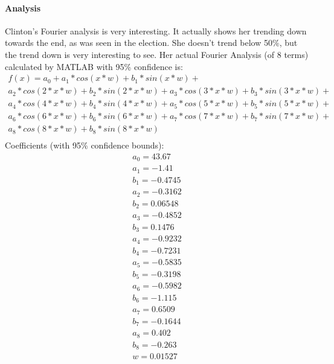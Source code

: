\documentclass[twoside]{article}
\begin{document}
              \paragraph{Analysis} Clinton's Fourier analysis is very interesting. It actually shows her trending down towards the end, as was seen in the election.
              She doesn't trend below 50\%, but the trend down is very interesting to see. Her actual Fourier Analysis (of 8 terms) calculated by MATLAB with 95\% confidence is:
              \newpage
              \begin{gather*}
                f(x) =
                a_0 + a_1*cos(x*w) + b_1*sin(x*w) + \\
                a_2*cos(2*x*w) + b_2*sin(2*x*w) + a_3*cos(3*x*w) + b_3*sin(3*x*w) + \\
                a_4*cos(4*x*w) + b_4*sin(4*x*w) + a_5*cos(5*x*w) + b_5*sin(5*x*w) + \\
                a_6*cos(6*x*w) + b_6*sin(6*x*w) + a_7*cos(7*x*w) + b_7*sin(7*x*w) + \\
                a_8*cos(8*x*w) + b_8*sin(8*x*w)\\
              \end{gather*}
              Coefficients (with 95\% confidence bounds):
              \begin{gather*}
                a_0 =       43.67 \\
                a_1 =       -1.41  \\
                b_1 =     -0.4745  \\
                a_2 =     -0.3162 \\
                b_2 =     0.06548  \\
                a_3 =     -0.4852  \\
                b_3 =      0.1476 \\
                a_4 =     -0.9232  \\
                b_4 =     -0.7231 \\
                a_5 =     -0.5835  \\
                b_5 =     -0.3198  \\
                a_6 =     -0.5982  \\
                b_6 =      -1.115  \\
                a_7 =      0.6509  \\
                b_7 =     -0.1644  \\
                a_8 =       0.402  \\
                b_8 =      -0.263  \\
                w =     0.01527  \\
              \end{gather*}
\end{document}
